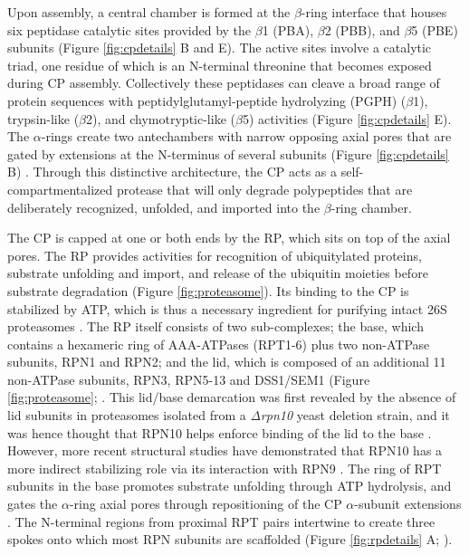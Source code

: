 Upon assembly, a central chamber is formed at the $\beta$-ring interface that houses six peptidase catalytic sites provided by the $\beta$1 (PBA), $\beta$2 (PBB), and $\beta$5 (PBE) subunits \citep{arendt97, heinemeyer97} (Figure \ref{fig:cpdetails} B and E).  The active sites involve a catalytic triad, one residue of which is an N-terminal threonine that becomes exposed during CP assembly.  Collectively these peptidases can cleave a broad range of protein sequences with peptidylglutamyl-peptide hydrolyzing (PGPH) ($\beta$1), trypsin-like ($\beta$2), and chymotryptic-like ($\beta$5) activities \citep{arendt97, groll99} (Figure \ref{fig:cpdetails} E).  The $\alpha$-rings create two antechambers with narrow opposing axial pores that are gated by extensions at the N-terminus of several subunits (Figure \ref{fig:cpdetails} B) \citep{groll00, ruschak10}.  Through this distinctive architecture, the CP acts as a self-compartmentalized protease that will only degrade polypeptides that are deliberately recognized, unfolded, and imported into the $\beta$-ring chamber.



	
	The CP is capped at one or both ends by the RP, which sits on top of the axial pores.  The RP provides activities for recognition of ubiquitylated proteins, substrate unfolding and import, and release of the ubiquitin moieties before substrate degradation (Figure \ref{fig:proteasome}).  Its binding to the CP is stabilized by ATP, which is thus a necessary ingredient for purifying intact 26S proteasomes \citep{smith05}. The RP itself consists of two sub-complexes; the base, which contains a hexameric ring of AAA-ATPases (RPT1-6) plus two non-ATPase subunits, RPN1 and RPN2; and the lid, which is composed of an additional 11 non-ATPase subunits, RPN3, RPN5-13 and DSS1/SEM1 (Figure \ref{fig:proteasome}; \citep{bhattacharyya14, book10, finley09, glickman98-c8Wsa, russell13}.  This lid/base demarcation was first revealed by the absence of lid subunits in proteasomes isolated from a \textit{Δrpn10} yeast deletion strain, and it was hence thought that RPN10 helps enforce binding of the lid to the base \citep{glickman98}.  However, more recent structural studies have demonstrated that RPN10 has a more indirect stabilizing role via its interaction with RPN9 \citep{lander12}.  The ring of RPT subunits in the base promotes substrate unfolding through ATP hydrolysis, and gates the $\alpha$-ring axial pores through repositioning of the CP $\alpha$-subunit extensions \citep{köhler01, rabl08, smith05}.  The N-terminal regions from proximal RPT pairs intertwine to create three spokes onto which most RPN subunits are scaffolded (Figure \ref{fig:rpdetails} A; \citep{beck12}).

